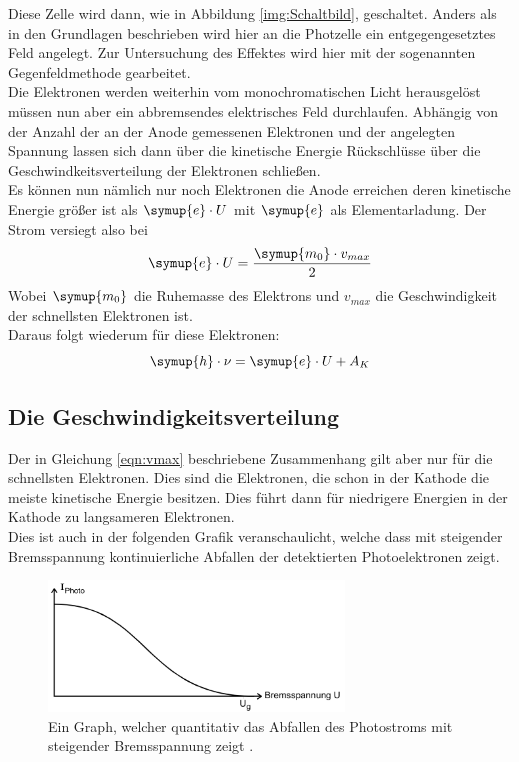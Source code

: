     \noindent Diese Zelle wird dann, wie in Abbildung \ref{img:Schaltbild}, geschaltet.
    Anders als in den Grundlagen beschrieben wird hier an die Photzelle ein entgegengesetztes Feld angelegt.
    Zur Untersuchung des Effektes wird hier mit der sogenannten Gegenfeldmethode gearbeitet.\\
    Die Elektronen werden weiterhin vom monochromatischen Licht herausgelöst müssen nun aber ein abbremsendes elektrisches Feld durchlaufen.
    Abhängig von der Anzahl der an der Anode gemessenen Elektronen und der angelegten Spannung lassen sich dann über die kinetische Energie 
    Rückschlüsse über die Geschwindkeitsverteilung der Elektronen schließen.\\
    Es können nun nämlich nur noch Elektronen die Anode erreichen deren kinetische Energie größer ist als $\symup{e} \cdot U$ mit $\symup{e}$ als Elementarladung\cite{e}.
    Der Strom versiegt also bei
    \begin{equation*}
        \symup{e} \cdot U= \frac{\symup{m_0}\cdot v_{max}}{2}
    \end{equation*}
    Wobei $\symup{m_0}$ die Ruhemasse des Elektrons \cite{massE} und $v_{max}$ die Geschwindigkeit der schnellsten Elektronen ist.\\
    Daraus folgt wiederum für diese Elektronen:
    \begin{equation}
        \symup{h}\cdot \nu= \symup{e} \cdot U + A_K
        \label{eqn:vmax}
    \end{equation}


    \subsection{Die Geschwindigkeitsverteilung}


    Der in Gleichung \ref{eqn:vmax} beschriebene Zusammenhang gilt aber nur für die schnellsten Elektronen.
    Dies sind die Elektronen, die schon in der Kathode die meiste kinetische Energie besitzen. 
    Dies führt dann für niedrigere Energien in der Kathode zu langsameren Elektronen.\\
    Dies ist auch in der folgenden Grafik veranschaulicht, welche dass mit steigender Bremsspannung kontinuierliche Abfallen der detektierten Photoelektronen zeigt.

    \begin{figure}[H]
        \centering
        \includegraphics[width=0.7\textwidth]{latex/images/Bremsspannung.PNG}
        \caption{Ein Graph, welcher quantitativ das Abfallen des Photostroms mit steigender Bremsspannung zeigt \protect \cite{500}.}
        \label{img:brems}
    \end{figure}

